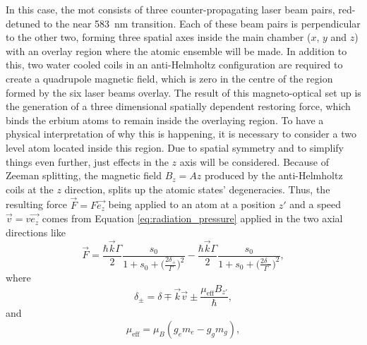 In this case, the \ac{mot} consists of three counter-propagating laser beam pairs, red-detuned to the near \SI{583}{\nano\meter} transition. Each of these beam pairs is perpendicular to the other two, forming three spatial axes inside the main chamber ($x$, $y$ and $z$) with an overlay region where the atomic ensemble will be made. In addition to this, two water cooled coils in an anti-Helmholtz configuration are required to create a quadrupole magnetic field, which is zero in the centre of the region formed by the six laser beams overlay. The result of this magneto-optical set up is the generation of a three dimensional spatially dependent restoring force, which binds the erbium atoms to remain inside the overlaying region. To have a physical interpretation of why this is happening, it is necessary to consider a two level atom located inside this region. Due to spatial symmetry and to simplify things even further, just effects in the $z$ axis will be considered. Because of Zeeman splitting, the magnetic field $B_z = A z$ produced by the anti-Helmholtz coils at the $z$ direction, splits up the atomic states' degeneracies. Thus, the resulting force $\vec{F} = F \vec{e_z}$ being applied to an atom at a position $z'$ and a speed $\vec{v} = v \vec{e_z}$ comes from Equation \eqref{eq:radiation_pressure} applied in the two axial directions like
\begin{equation}\label{eq:MOT_force}
	\vec{F} = \frac{\hbar \vec{k} \Gamma}{2} \frac{s_0}{1 + s_0 + \Big(\frac{2\delta_+}{\Gamma}\Big)^2} - \frac{\hbar \vec{k} \Gamma}{2} \frac{s_0}{1 + s_0 + \Big(\frac{2\delta_-}{\Gamma}\Big)^2},
\end{equation}
where
\begin{equation}\label{eq:delta_plus_minus}
	\delta_\pm = \delta \mp \vec{k} \vec{v} \pm \frac{ \mu_{ \text{eff} } B_{z'} }{ \hbar },
\end{equation}
and
\begin{equation}\label{eq:mu_eff}
	\mu_{ \text{eff} } = \mu_B (g_e m_e - g_g m_g),
\end{equation}
